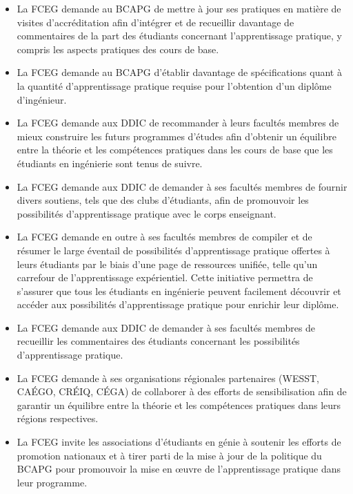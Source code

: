 \begin{itemize}
 \item La FCEG demande au BCAPG de mettre à jour ses pratiques en matière de visites d'accréditation afin d'intégrer et de recueillir davantage de commentaires de la part des étudiants concernant l'apprentissage pratique, y compris les aspects pratiques des cours de base.
 \item La FCEG demande au BCAPG d'établir davantage de spécifications quant à la quantité d'apprentissage pratique requise pour l'obtention d'un diplôme d'ingénieur.
 \item La FCEG demande aux DDIC de recommander à leurs facultés membres de mieux construire les futurs programmes d'études afin d'obtenir un équilibre entre la théorie et les compétences pratiques dans les cours de base que les étudiants en ingénierie sont tenus de suivre.
 \item La FCEG demande aux DDIC de demander à ses facultés membres de fournir divers soutiens, tels que des clubs d'étudiants, afin de promouvoir les possibilités d'apprentissage pratique avec le corps enseignant.
 \item La FCEG demande en outre à ses facultés membres de compiler et de résumer le large éventail de possibilités d'apprentissage pratique offertes à leurs étudiants par le biais d'une page de ressources unifiée, telle qu'un carrefour de l'apprentissage expérientiel. Cette initiative permettra de s'assurer que tous les étudiants en ingénierie peuvent facilement découvrir et accéder aux possibilités d'apprentissage pratique pour enrichir leur diplôme.
 \item La FCEG demande aux DDIC de demander à ses facultés membres de recueillir les commentaires des étudiants concernant les possibilités d'apprentissage pratique.
 \item La FCEG demande à ses organisations régionales partenaires (WESST, CAÉGO, CRÉIQ, CÉGA) de collaborer à des efforts de sensibilisation afin de garantir un équilibre entre la théorie et les compétences pratiques dans leurs régions respectives.
 \item La FCEG invite les associations d'étudiants en génie à soutenir les efforts de promotion nationaux et à tirer parti de la mise à jour de la politique du BCAPG pour promouvoir la mise en œuvre de l'apprentissage pratique dans leur programme.
\end{itemize}

